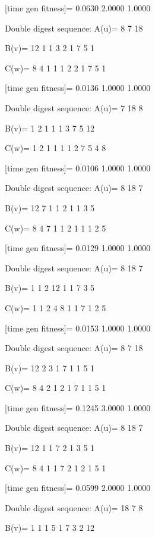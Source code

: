 [time gen fitness]=
    0.0630    2.0000    1.0000

Double digest sequence:
A(u)=
     8     7    18

B(v)=
    12     1     1     3     2     1     7     5     1

C(w)=
     8     4     1     1     1     2     2     1     7     5     1

[time gen fitness]=
    0.0136    1.0000    1.0000

Double digest sequence:
A(u)=
     7    18     8

B(v)=
     1     2     1     1     1     3     7     5    12

C(w)=
     1     2     1     1     1     1     2     7     5     4     8

[time gen fitness]=
    0.0106    1.0000    1.0000

Double digest sequence:
A(u)=
     8    18     7

B(v)=
    12     7     1     1     2     1     1     3     5

C(w)=
     8     4     7     1     1     2     1     1     1     2     5

[time gen fitness]=
    0.0129    1.0000    1.0000

Double digest sequence:
A(u)=
     8    18     7

B(v)=
     1     1     2    12     1     1     7     3     5

C(w)=
     1     1     2     4     8     1     1     7     1     2     5

[time gen fitness]=
    0.0153    1.0000    1.0000

Double digest sequence:
A(u)=
     8     7    18

B(v)=
    12     2     3     1     7     1     1     5     1

C(w)=
     8     4     2     1     2     1     7     1     1     5     1

[time gen fitness]=
    0.1245    3.0000    1.0000

Double digest sequence:
A(u)=
     8    18     7

B(v)=
    12     1     1     7     2     1     3     5     1

C(w)=
     8     4     1     1     7     2     1     2     1     5     1

[time gen fitness]=
    0.0599    2.0000    1.0000

Double digest sequence:
A(u)=
    18     7     8

B(v)=
     1     1     1     5     1     7     3     2    12

